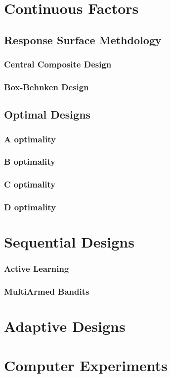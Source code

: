 \section{Continuous Factors}



\subsection{Response Surface Methdology}
\label{sec:response_surface}

\subsubsection{Central Composite Design}

\subsubsection{Box-Behnken Design}

\subsection{Optimal Designs}

\subsubsection{A optimality}
\subsubsection{B optimality}
\subsubsection{C optimality}
\subsubsection{D optimality}




\section{Sequential Designs}

\subsubsection{Active Learning}


\subsubsection{MultiArmed Bandits}




\section{Adaptive Designs}



\section{Computer Experiments}

